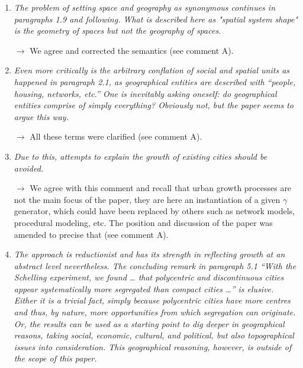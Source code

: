 \documentclass[11pt,a4paper,sans]{moderncv}        %
\begin{document}
\begin{enumerate}
  \medskip

  \item \textit{The problem of setting space and geography as synonymous continues in paragraphs 1.9 and following. What is described here as "spatial system shape" is the geometry of spaces but not the geography of spaces.}

  $\rightarrow$ We agree and corrected the semantics (see comment A). 

  \medskip

  \item \textit{Even more critically is the arbitrary conflation of social and spatial units as happened in paragraph 2.1, as geographical entities are described with “people, housing, networks, etc.” One is inevitably asking oneself: do geographical entities comprise of simply everything? Obviously not, but the paper seems to argue this way.}
  
  $\rightarrow$ All these terms were clarified (see comment A). 

  \medskip

  \item \textit{Due to this, attempts to explain the growth of existing cities should be avoided.}
  
  $\rightarrow$ We agree with this comment and recall that urban growth processes are not the main focus of the paper, they are here an instantiation of a given $\gamma$ generator, which could have been replaced by others such as network models, procedural modeling, etc. The position and discussion of the paper was amended to precise that (see comment A).

 
  \medskip
 
 
  \item \textit{The approach is reductionist and has its strength in reflecting growth at an abstract level nevertheless. The concluding remark in paragraph 5.1 “With the Schelling experiment, we found … that polycentric and discontinuous cities appear systematically more segregated than compact cities …” is elusive. Either it is a trivial fact, simply because polycentric cities have more centres and thus, by nature, more opportunities from which segregation can originate. Or, the results can be used as a starting point to dig deeper in geographical reasons, taking social, economic, cultural, and political, but also topographical issues into consideration. This geographical reasoning, however, is outside of the scope of this paper. }


\end{enumerate}
\end{document}
